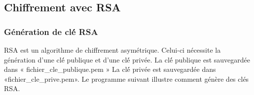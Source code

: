 \documentclass[11pt]{article}
\begin{document}
    \hypertarget{chiffrement-avec-rsa}{%
\subsection{Chiffrement avec RSA}\label{chiffrement-avec-rsa}}

\hypertarget{guxe9nuxe9ration-de-cluxe9ux301-rsa}{%
\subsubsection{Génération de clé́
RSA}\label{guxe9nuxe9ration-de-cluxe9ux301-rsa}}

RSA est un algorithme de chiffrement asymétrique. Celui-ci nécessite la
génération d'une clé́ publique et d'une clé́ privée. La clé́ publique est
sauvegardée dans « fichier\_cle\_publique.pem » La clé́ privée est
sauvegardée dans «fichier\_cle\_prive.pem». Le programme suivant
illustre comment génère des clés RSA.
\end{document}
